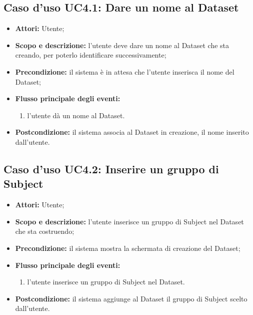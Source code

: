 \subsection{Caso d'uso UC4.1: Dare un nome al Dataset}
\begin{itemize}
\item \textbf{Attori:} Utente;
\item \textbf{Scopo e descrizione:} l'utente deve dare un nome al Dataset\glossario{} che sta creando, per poterlo identificare successivamente;
\item \textbf{Precondizione:} il sistema è in attesa che l'utente inserisca il nome del Dataset\glossario{};
\item \textbf{Flusso principale degli eventi:}
\begin{enumerate}
\item l'utente dà un nome al Dataset\glossario{}.
\end{enumerate}
\item \textbf{Postcondizione:} il sistema associa al Dataset\glossario{} in creazione, il nome inserito dall'utente.
\end{itemize}

\subsection{Caso d'uso UC4.2: Inserire un gruppo di Subject}
\begin{itemize}
\item \textbf{Attori:} Utente;
\item \textbf{Scopo e descrizione:} l'utente inserisce un gruppo di Subject\glossario{} nel Dataset\glossario{} che sta costruendo;
\item \textbf{Precondizione:} il sistema mostra la schermata di creazione del Dataset\glossario{};
\item \textbf{Flusso principale degli eventi:}
\begin{enumerate}
\item l'utente inserisce un gruppo di Subject\glossario{} nel Dataset\glossario{}.
\end{enumerate}
\item \textbf{Postcondizione:} il sistema aggiunge al Dataset\glossario{} il gruppo di Subject\glossario{} scelto dall'utente.
\end{itemize}

